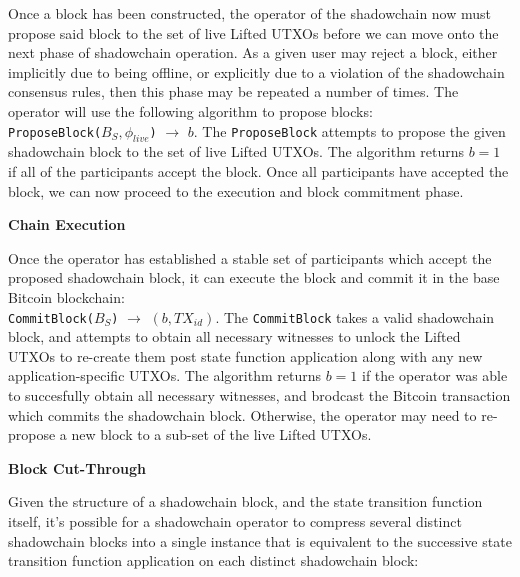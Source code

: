\documentclass[10pt,a4paper]{article}
\theoremstyle{definition}
\begin{document}
Once a block has been constructed, the operator of the shadowchain now must
propose said block to the set of live Lifted UTXOs before we can move onto the
next phase of shadowchain operation. As a given user may reject a block, either
implicitly due to being offline, or explicitly due to a violation of the
shadowchain consensus rules, then this phase may be repeated a number of times.
The operator will use the following algorithm to propose blocks: \\

\texttt{ProposeBlock($B_S, \phi_{live}$)} $\rightarrow$ $b$. The
\texttt{ProposeBlock} attempts to propose the given shadowchain block to the
set of live Lifted UTXOs. The algorithm returns $b=1$ if all of the
participants accept the block. Once all participants have accepted the block,
we can now proceed to the execution and block commitment phase.


\begin{center}
    \textbf{Chain Execution}
\end{center}

Once the operator has established a stable set of participants which accept the
proposed shadowchain block, it can execute the block and commit it in the base
Bitcoin blockchain: \\

\texttt{CommitBlock($B_S$)} $\rightarrow$ $(b, TX_{id})$. The
\texttt{CommitBlock} takes a valid shadowchain block, and attempts to obtain
all necessary witnesses to unlock the Lifted UTXOs to re-create them post state
function application along with any new application-specific UTXOs. The
algorithm returns $b=1$ if the operator was able to succesfully obtain all
necessary witnesses, and brodcast the Bitcoin transaction which commits the
shadowchain block. Otherwise, the operator may need to re-propose a new block
to a sub-set of the live Lifted UTXOs.

\begin{center}
    \textbf{Block Cut-Through}
\end{center}

Given the structure of a shadowchain block, and the state transition function
itself, it's possible for a shadowchain operator to compress several distinct
shadowchain blocks into a single instance that is equivalent to the successive
state transition function application on each distinct shadowchain block: \\
\end{document}

